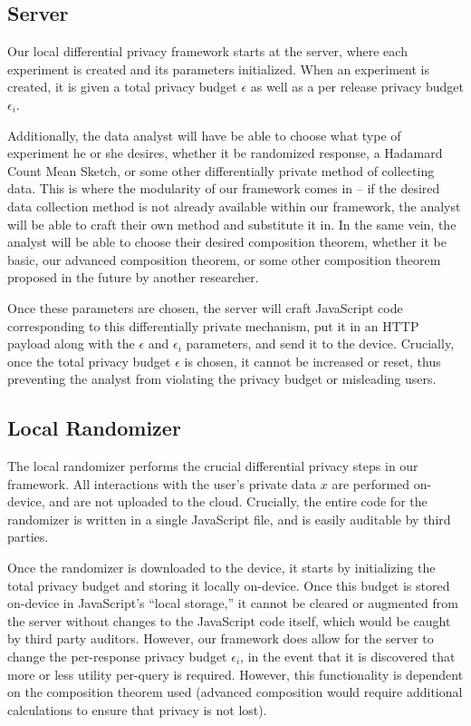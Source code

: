 \documentclass[12pt]{article}
\theoremstyle{definition}
\begin{document}
\bigskip

\subsection{Server}

\noindent

Our local differential privacy framework starts at the server, where each experiment is created and its parameters initialized. When an experiment is created, it is given a total privacy budget $\epsilon$ as well as a per release privacy budget $\epsilon_i$.

\bigskip

Additionally, the data analyst will have be able to choose what type of experiment he or she desires, whether it be randomized response, a Hadamard Count Mean Sketch, or some other differentially private method of collecting data. This is where the modularity of our framework comes in -- if the desired data collection method is not already available within our framework, the analyst will be able to craft their own method and substitute it in. In the same vein, the analyst will be able to choose their desired composition theorem, whether it be basic, our advanced composition theorem, or some other composition theorem proposed in the future by another researcher.

\bigskip

Once these parameters are chosen, the server will craft JavaScript code corresponding to this differentially private mechanism, put it in an HTTP payload along with the $\epsilon$ and $\epsilon_i$ parameters, and send it to the device. Crucially, once the total privacy budget $\epsilon$ is chosen, it cannot be increased or reset, thus preventing the analyst from violating the privacy budget or misleading users.

\subsection{Local Randomizer}

\noindent

The local randomizer performs the crucial differential privacy steps in our framework. All interactions with the user's private data $x$ are performed on-device, and are not uploaded to the cloud. Crucially, the entire code for the randomizer is written in a single JavaScript file, and is easily auditable by third parties.

\bigskip

Once the randomizer is downloaded to the device, it starts by initializing the total privacy budget and storing it locally on-device. Once this budget is stored on-device in JavaScript's ``local storage,'' it cannot be cleared or augmented from the server without changes to the JavaScript code itself, which would be caught by third party auditors. However, our framework does allow for the server to change the per-response privacy budget $\epsilon_i$, in the event that it is discovered that more or less utility per-query is required. However, this functionality is dependent on the composition theorem used (advanced composition would require additional calculations to ensure that privacy is not lost).
\end{document}
